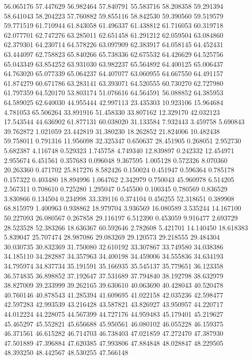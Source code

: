 56.065176
57.447629
56.982464
57.840791
55.583716
58.208358
59.291394
58.641043
58.204223
57.760882
59.855116
58.842530
59.390560
59.519579
59.771519
61.710944
61.843058
61.496337
61.438812
61.716053
60.319718
62.077701
62.747276
63.285011
62.651458
61.291212
62.059504
63.084860
62.379301
64.230714
64.578226
63.097909
62.383917
64.058145
64.452431
63.444097
62.758823
65.840266
65.738336
62.675532
64.426629
64.525756
65.043349
63.854252
63.931030
63.982237
65.564892
64.400125
65.006437
64.763020
65.077339
65.064237
64.407077
63.060955
64.667550
64.491157
61.874279
60.671786
63.283141
63.393071
64.520555
60.730270
62.727980
61.797359
64.520170
53.803174
51.076616
64.564591
56.088852
64.385953
64.589025
62.640030
44.955444
42.997113
23.435303
10.923106
15.964684
4.781053
65.506264
33.891916
51.458330
33.807162
12.329170
42.032123
17.543544
44.636902
61.877131
60.038020
31.133584
7.932443
3.459758
5.690843
39.762872
1.021059
23.442819
31.380230
18.262852
21.824006
10.482438
59.758011
0.791316
11.956098
32.325347
0.650637
28.451905
0.268051
2.952730
5.682387
4.116748
0.529323
1.745758
4.749340
12.839897
0.242332
12.454971
2.955674
6.451561
0.357683
0.096048
9.367595
1.005128
0.572326
8.070360
20.263360
0.471702
25.817276
8.582426
0.150024
0.451947
0.596364
0.785178
0.157322
0.403480
18.894996
1.064762
2.342979
0.750043
45.960978
6.514205
2.567311
0.708610
0.725280
1.295047
0.545500
0.100345
0.780569
0.836529
3.830866
0.134504
0.234998
33.339116
0.374104
0.456255
52.318651
0.389908
68.815979
1.400963
0.938862
18.979704
3.936569
16.080589
3.535244
14.167100
50.227093
26.080567
0.267858
29.116197
6.512390
0.453059
9.916477
2.693729
28.523528
52.383266
18.636367
60.592646
2.782608
5.421701
14.140450
18.618383
5.839047
25.707474
28.987086
29.083269
29.120573
29.218555
29.484304
30.030735
30.832369
31.750080
32.610192
33.307867
33.749580
34.038386
34.185110
34.282887
34.357963
34.400198
34.459006
34.555836
34.634193
34.795974
34.837734
35.191591
35.166935
35.545137
35.779651
36.123358
36.574835
36.898852
37.192647
37.531689
37.794840
38.192798
38.632979
38.827009
39.233999
39.262165
39.630610
40.063690
40.428043
40.520478
40.760146
40.878543
41.285394
41.609695
41.022158
42.035236
42.598477
42.597283
42.993539
43.216428
43.587821
43.826927
43.950957
44.220717
44.012224
44.228075
44.567399
44.727176
44.959483
45.179401
45.219627
45.465297
45.552821
45.656688
45.950561
46.080102
46.055228
46.159375
46.371561
46.615282
46.714703
46.738403
47.021859
47.272470
47.387930
47.501889
47.396884
47.620385
47.993806
47.884848
48.028847
48.229505
48.393250
48.442567
48.530255
47.566148
